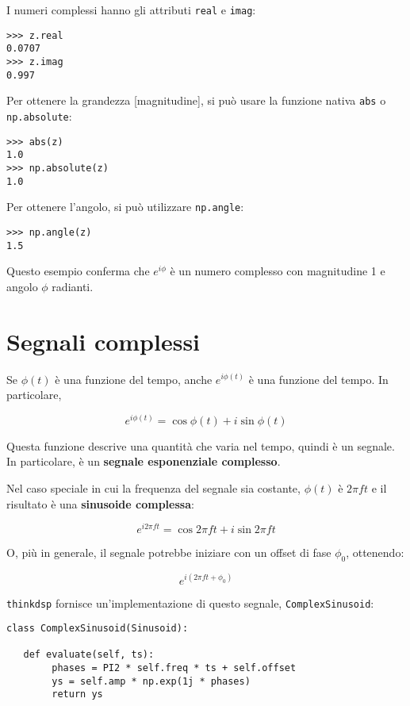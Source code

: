 \documentclass[12pt]{book} \usepackage[width=5.5in,height=8.5in, hmarginratio=3:2,vmarginratio=1:1]{geometry}
\begin{document}
I numeri complessi hanno gli attributi {\tt real} e {\tt imag}:

\begin{verbatim} 
>>> z.real
0.0707
>>> z.imag
0.997
 \end{verbatim} 

Per ottenere la grandezza [magnitudine], si può usare la funzione nativa {\tt abs} o {\tt np.absolute}:

\begin{verbatim} 
>>> abs(z)
1.0
>>> np.absolute(z)
1.0
 \end{verbatim} 

Per ottenere l'angolo, si può utilizzare {\tt np.angle}:

\begin{verbatim} 
>>> np.angle(z)
1.5
 \end{verbatim} 

Questo esempio conferma che $e^{i \phi}$ è un numero complesso con magnitudine 1 e angolo $\phi$ radianti.

\section{Segnali complessi} 

Se $\phi(t)$ è una funzione del tempo, anche $e^{i \phi(t)}$ è una funzione del tempo. In particolare,

%
\[ e^{i \phi(t)} = \cos \phi(t) + i \sin \phi(t) \] 

%
Questa funzione descrive una quantità che varia nel tempo, quindi è un segnale. In particolare, è un {\bf segnale esponenziale complesso}.

Nel caso speciale in cui la frequenza del segnale sia costante, $\phi(t)$ è $2 \pi f t$ e il risultato è una {\bf sinusoide complessa}:

%
\[ e^{i 2 \pi f t} = \cos 2 \pi f t + i \sin 2 \pi f t \] 

%
O, più in generale, il segnale potrebbe iniziare con un offset di fase $\phi_0$, ottenendo:

%
\[ e^{i (2 \pi f t + \phi_0)} \] 

%
{\tt thinkdsp} fornisce un'implementazione di questo segnale, {\tt ComplexSinusoid}:

\begin{verbatim} 
class ComplexSinusoid(Sinusoid):

   def evaluate(self, ts):
        phases = PI2 * self.freq * ts + self.offset
        ys = self.amp * np.exp(1j * phases)
        return ys
 \end{verbatim} 
\end{document}
